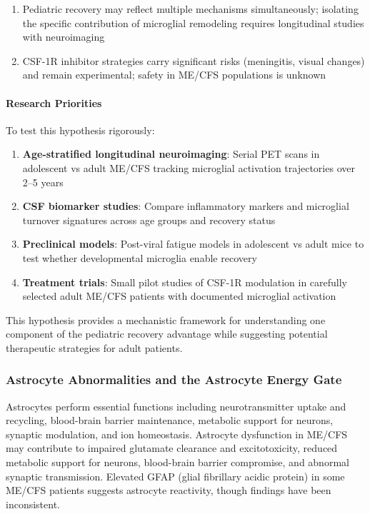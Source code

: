 \begin{hypothesis}
\begin{enumerate}
    \item Pediatric recovery may reflect multiple mechanisms simultaneously; isolating the specific contribution of microglial remodeling requires longitudinal studies with neuroimaging

    \item CSF-1R inhibitor strategies carry significant risks (meningitis, visual changes) and remain experimental; safety in ME/CFS populations is unknown
\end{enumerate}

\paragraph{Research Priorities}

To test this hypothesis rigorously:

\begin{enumerate}
    \item \textbf{Age-stratified longitudinal neuroimaging}: Serial PET scans in adolescent vs adult ME/CFS tracking microglial activation trajectories over 2--5 years

    \item \textbf{CSF biomarker studies}: Compare inflammatory markers and microglial turnover signatures across age groups and recovery status

    \item \textbf{Preclinical models}: Post-viral fatigue models in adolescent vs adult mice to test whether developmental microglia enable recovery

    \item \textbf{Treatment trials}: Small pilot studies of CSF-1R modulation in carefully selected adult ME/CFS patients with documented microglial activation
\end{enumerate}

This hypothesis provides a mechanistic framework for understanding one component of the pediatric recovery advantage while suggesting potential therapeutic strategies for adult patients.

\end{hypothesis}

\subsubsection{Astrocyte Abnormalities and the Astrocyte Energy Gate}
\label{sec:astrocyte-energy-gate}

Astrocytes perform essential functions including neurotransmitter uptake and recycling, blood-brain barrier maintenance, metabolic support for neurons, synaptic modulation, and ion homeostasis. Astrocyte dysfunction in ME/CFS may contribute to impaired glutamate clearance and excitotoxicity, reduced metabolic support for neurons, blood-brain barrier compromise, and abnormal synaptic transmission. Elevated GFAP (glial fibrillary acidic protein) in some ME/CFS patients suggests astrocyte reactivity, though findings have been inconsistent.

